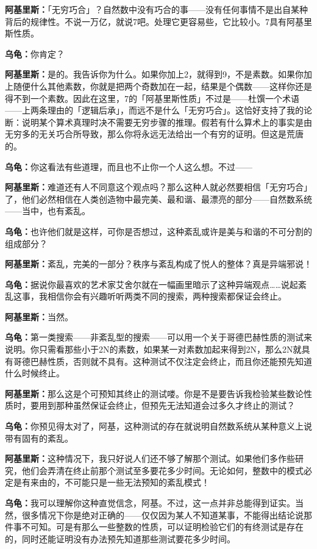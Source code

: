 \documentclass[
  12pt,
  twoside,
  openright,
  oldfontcommands,
]{memoir}
\newcommand{\dialogname}[1]{{\heifamily\bfseries #1}}
\begin{document}
\dialogname{阿基里斯：}「无穷巧合」？自然数中没有巧合的事------没有任何事情不是出自某种背后的规律性。不说一万亿，就说7吧。处理它更容易些，它比较小。7具有阿基里斯性质。

\dialogname{乌龟：}你肯定？

\dialogname{阿基里斯：}是的。我告诉你为什么。如果你加上2，就得到9，不是素数。如果你加上随便什么其他素数，你就是把两个奇数加在一起，结果是个偶数------这样你还是得不到一个素数。因此在这里，7的「阿基里斯性质」不过是------杜馔一个术语------上两条理由的「逻辑后承」，而远不是什么「无穷巧合」。这恰好支持了我的论断：说明某个算术真理时决不需要无穷步骤的推理。假若有什么算术上的事实是由无穷多的无关巧合所导致，那么你将永远无法给出一个有穷的证明。但这是荒唐的。

\dialogname{乌龟：}你这看法有些道理，而且也不止你一个人这么想。不过------

\dialogname{阿基里斯：}难道还有人不同意这个观点吗？那么这种人就必然要相信「无穷巧合」了，他们必然相信在人类创造物中最完美、最和谐、最漂亮的部分------自然数系统------当中，也有紊乱。

\dialogname{乌龟：}也许他们就是这样，可你是否想过，这种紊乱或许是美与和谐的不可分割的组成部分？

\dialogname{阿基里斯：}紊乱，完美的一部分？秩序与紊乱构成了悦人的整体？真是异端邪说！

\dialogname{乌龟：}据说你最喜欢的艺术家艾舍尔就在一幅画里暗示了这种异端观点\ldots\ldots 说起紊乱这事，我相信你会有兴趣听听两类不同的搜索，两种搜索都保证会终止。

\dialogname{阿基里斯：}当然。

\dialogname{乌龟：}第一类搜索------非紊乱型的搜索------可以用一个关于哥德巴赫性质的测试来说明。你只需看那些小于2N的素数，如果某一对素数加起来得到2N，那么2N就具有哥德巴赫性质，否则就不具有。这种测试不仅注定会终止，而且你还能预先知道什么时候终止。

\dialogname{阿基里斯：}那么这是个可预知其终止的测试喽。你是不是要告诉我检验某些数论性质时，要用到那种虽然保证会终止，但预先无法知道会过多久才终止的测试？

\dialogname{乌龟：}你预见得太对了，阿基，这种测试的存在就说明自然数系统从某种意义上说带有固有的紊乱。

\dialogname{阿基里斯：}这种情况下，我只好说人们还不够了解那个测试。如果他们多作些研究，他们会弄清在终止前那个测试至多要花多少时间。无论如何，整数中的模式必定是有来由的，不可能只是一些无法预知的紊乱模式！

\dialogname{乌龟：}我可以理解你这种直觉信念，阿基。不过，这一点并非总能得到证实。当然，很多情况下你是绝对正确的------仅仅因为某人不知道某事，不能得出结论说那件事不可知。可是有那么一些整数的性质，可以证明检验它们的有终测试是存在的，同时还能证明没有办法预先知道那些测试要花多少时间。
\end{document}
